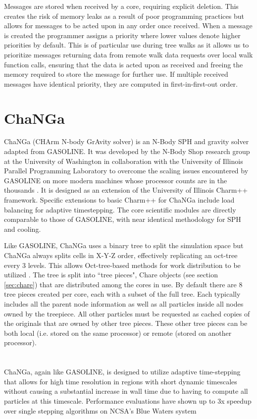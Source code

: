 Messages are stored when received by a core, requiring explicit deletion. This creates the risk of memory leaks as a result of poor programming practices but allows for messages to be acted upon in any order once received. When a message is created the programmer assigns a priority where lower values denote higher priorities by default. This is of particular use during tree walks as it allows us to prioritize messages returning data from remote walk data requests over local walk function calls, ensuring that the data is acted upon as received and freeing the memory required to store the message for further use. If multiple received messages have identical priority, they are computed in first-in-first-out order. 

\section{ChaNGa}
\label{sec:ChaNGa}
ChaNGa (CHArm N-body GrAvity solver) is an N-Body SPH and gravity solver adapted from GASOLINE. It was developed by the N-Body Shop research group at the University of Washington in collaboration with the University of Illinois Parallel Programming Laboratory to overcome the scaling issues encountered by GASOLINE on more modern machines whose processor counts are in the thousands \citep{ChaNGa1}. It is designed as an extension of the University of Illinois Charm++ framework. Specific extensions to basic Charm++ for ChaNGa include load balancing for adaptive timestepping. The core scientific modules are directly comparable to those of GASOLINE, with near identical methodology for SPH and cooling.

Like GASOLINE, ChaNGa uses a binary tree to split the simulation space but ChaNGa always splits cells in X-Y-Z order, effectively replicating an oct-tree every 3 levels. This allows Oct-tree-based methods for work distribution to be utilized \citep{ChaNGa1}. The tree is split into ``tree pieces", Chare objects (see section \ref{sec:chare}) that are distributed among the cores in use. By default there are 8 tree pieces created per core, each with a subset of the full tree. Each typically includes all the parent node information as well as all particles inside all nodes owned by the treepiece. All other particles must be requested as cached copies of the originals that are owned by other tree pieces. These other tree pieces can be both local (i.e. stored on the same processor) or remote (stored on another processor). 
\\
\\
\\
ChaNGa, again like GASOLINE, is designed to utilize adaptive time-stepping that allows for high time resolution in regions with short dynamic timescales without causing a substantial increase in wall time due to having to compute all particles at this timescale. Performance evaluations have shown up to 3x speedup over single stepping algorithms on NCSA's Blue Waters system \citep{ChaNGa3}

